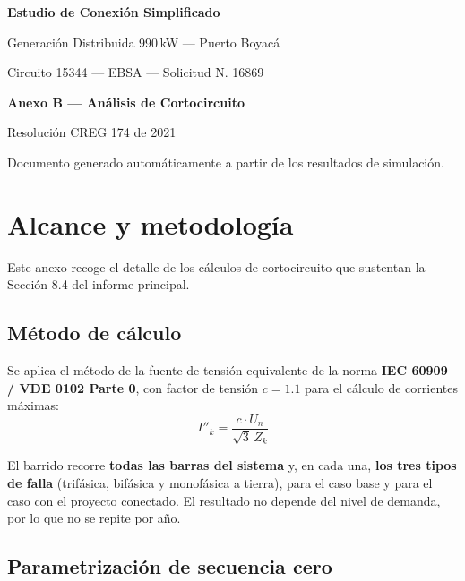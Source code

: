 \documentclass[11pt,a4paper]{article}
\begin{document}
\begin{titlepage}
\centering
\vspace*{3cm}
{\Large\bfseries Estudio de Conexi\'on Simplificado\par}
\vspace{0.4cm}
{\large Generaci\'on Distribuida 990\,kW --- Puerto Boyac\'a\par}
\vspace{0.2cm}
{\large Circuito 15344 --- EBSA --- Solicitud N.\textdegree{} 16869\par}
\vspace{2.5cm}
{\Huge\bfseries Anexo B --- An\'alisis de Cortocircuito\par}
\vspace{2cm}
{\large Resoluci\'on CREG 174 de 2021\par}
\vfill
{\small Documento generado autom\'aticamente a partir de los resultados de simulaci\'on.\par}
\end{titlepage}

\tableofcontents
\newpage


\section{Alcance y metodolog\'ia}

Este anexo recoge el detalle de los c\'alculos de cortocircuito que sustentan la
Secci\'on 8.4 del informe principal.

\subsection{M\'etodo de c\'alculo}

Se aplica el m\'etodo de la fuente de tensi\'on equivalente de la norma
\textbf{IEC 60909 / VDE 0102 Parte 0}, con factor de tensi\'on $c = 1.1$ para el
c\'alculo de corrientes m\'aximas:
\[
I''_{k} = \frac{c \cdot U_n}{\sqrt{3}\, Z_k}
\]

El barrido recorre \textbf{todas las barras del sistema} y, en cada una,
\textbf{los tres tipos de falla} (trif\'asica, bif\'asica y monof\'asica a
tierra), para el caso base y para el caso con el proyecto conectado. El
resultado no depende del nivel de demanda, por lo que no se repite por a\~no.

\subsection{Parametrizaci\'on de secuencia cero}
\end{document}
